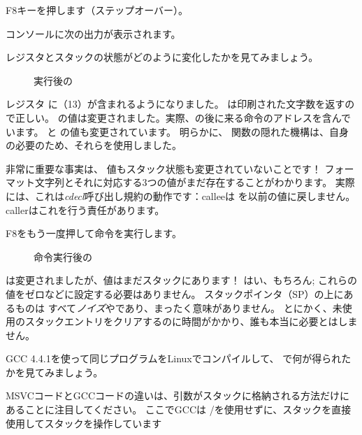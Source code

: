 \clearpage
F8キーを押します（ステップオーバー）。

コンソールに次の出力が表示されます。



レジスタとスタックの状態がどのように変化したかを見てみましょう。

\begin{figure}[H]
\centering
{}
\caption{\printf{} 実行後の \olly }
\label{fig:printf3_olly_3}
\end{figure}

レジスタ \EAX に（13）が含まれるようになりました。 
\printf は印刷された文字数を返すので正しい。 
\EIP の値は変更されました。実際、の後に来る命令のアドレスを含んでいます。 
\ECX と \EDX の値も変更されています。 
明らかに、 \printf 関数の隠れた機構は、自身の必要のため、それらを使用しました。

非常に重要な事実は、 \ESP 値もスタック状態も変更されていないことです！
フォーマット文字列とそれに対応する3つの値がまだ存在することがわかります。
実際には、これは\emph{cdecl}呼び出し規約の動作です：\gls{callee}は \ESP を以前の値に戻しません。 
\gls{caller}はこれを行う責任があります。

\clearpage
F8をもう一度押して命令を実行します。

\begin{figure}[H]
\centering
{}
\caption{命令実行後の \olly }
\label{fig:printf3_olly_4}
\end{figure}

\ESP は変更されましたが、値はまだスタックにあります！ 
はい、もちろん; これらの値をゼロなどに設定する必要はありません。 
スタックポインタ（\ac{SP}）の上にあるものは
すべて\emph{ノイズ}や\emph{\garbage{}}であり、まったく意味がありません。
とにかく、未使用のスタックエントリをクリアするのに時間がかかり、誰も本当に必要とはしません。

GCC 4.4.1を使って同じプログラムをLinuxでコンパイルして、 \IDA で何が得られたかを見てみましょう。



MSVCコードとGCCコードの違いは、引数がスタックに格納される方法だけにあることに注目してください。 
ここでGCCは \PUSH/\POP を使用せずに、スタックを直接使用してスタックを操作しています



